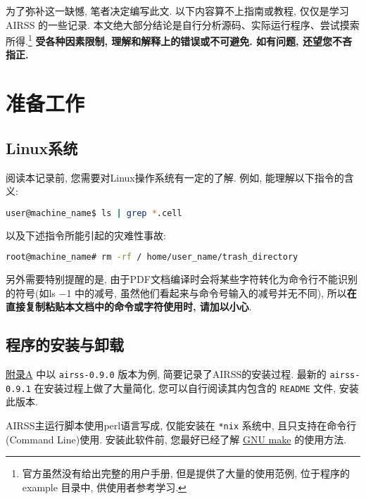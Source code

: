 \documentclass[a4paper, 10pt]{article}
\begin{document}
为了弥补这一缺憾, 笔者决定编写此文. 以下内容算不上指南或教程, 仅仅是学习 AIRSS 的一些记录. 本文绝大部分结论是自行分析源码、实际运行程序、尝试摸索所得.\footnote{官方虽然没有给出完整的用户手册, 但是提供了大量的使用范例, 位于程序的 example 目录中, 供使用者参考学习.} \textbf{受各种因素限制, 理解和解释上的错误或不可避免. 如有问题, 还望您不吝指正.}
\newpage
\section{准备工作}
\subsection{Linux系统} 
阅读本记录前, 您需要对Linux操作系统有一定的了解. 例如, 能理解以下指令的含义:
\begin{lstlisting}[language={bash}]
user@machine_name$ ls | grep *.cell
\end{lstlisting}

以及下述指令所能引起的灾难性事故:
\begin{lstlisting}[language={bash}]
root@machine_name# rm -rf / home/user_name/trash_directory
\end{lstlisting}

另外需要特别提醒的是, 由于PDF文档编译时会将某些字符转化为命令行不能识别的符号(如ls \(-\)1 中的减号, 虽然他们看起来与命令号输入的减号并无不同), 所以\textbf{在直接复制粘贴本文档中的命令或字符使用时, 请加以小心}.

\subsection{程序的安装与卸载}
\hyperref[sec:airss-install]{附录A} 中以 \verb|airss-0.9.0| 版本为例, 简要记录了AIRSS的安装过程. 最新的 \verb|airss-0.9.1| 在安装过程上做了大量简化, 您可以自行阅读其内包含的 \verb|README| 文件, 安装此版本.

AIRSS主运行脚本使用perl语言写成, 仅能安装在 \verb|*nix| 系统中, 且只支持在命令行(Command Line)使用. 安装此软件前, 您最好已经了解 \href{https://www.gnu.org/software/make/manual/}{GNU make} 的使用方法.
\end{document}
